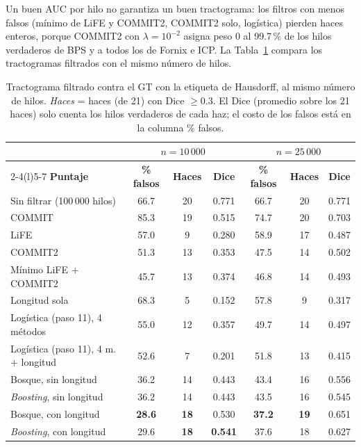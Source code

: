 \documentclass[11pt,a4paper]{article}
\begin{document}
Un buen AUC por hilo no garantiza un buen tractograma: los filtros con menos falsos
(m\'inimo de LiFE y COMMIT2, COMMIT2 solo, log\'istica) pierden haces enteros, porque
COMMIT2 con $\lambda=10^{-2}$ asigna peso 0 al 99.7\,\% de los hilos verdaderos de BPS y a
todos los de Fornix e ICP. La Tabla~\ref{tab:modelos-haces} compara los tractogramas
filtrados con el mismo n\'umero de hilos.

\begin{table}[H]
\centering
\small
\begin{tabularx}{\textwidth}{@{}Xcccccc@{}}
\toprule
 & \multicolumn{3}{c}{$n=10\,000$} & \multicolumn{3}{c}{$n=25\,000$}\\
\cmidrule(lr){2-4}\cmidrule(l){5-7}
\textbf{Puntaje} & \textbf{\% falsos} & \textbf{Haces} & \textbf{Dice} & \textbf{\% falsos} & \textbf{Haces} & \textbf{Dice}\\
\midrule
Sin filtrar (100\,000 hilos)       & 66.7 & 20 & 0.771 & 66.7 & 20 & 0.771\\
COMMIT                             & 85.3 & 19 & 0.515 & 74.7 & 20 & 0.703\\
LiFE                               & 57.0 &  9 & 0.280 & 58.9 & 17 & 0.487\\
COMMIT2                            & 51.3 & 13 & 0.353 & 47.5 & 14 & 0.502\\
M\'inimo LiFE + COMMIT2            & 45.7 & 13 & 0.374 & 46.8 & 14 & 0.493\\
Longitud sola                      & 68.3 &  5 & 0.152 & 57.8 &  9 & 0.317\\
\addlinespace
Log\'istica (paso 11), 4 m\'etodos & 55.0 & 12 & 0.357 & 49.7 & 14 & 0.497\\
Log\'istica (paso 11), 4 m. + longitud & 52.6 &  7 & 0.201 & 51.8 & 13 & 0.415\\
Bosque, sin longitud               & 36.2 & 14 & 0.443 & 43.4 & 16 & 0.556\\
\textit{Boosting}, sin longitud    & 36.2 & 14 & 0.443 & 43.5 & 16 & 0.545\\
Bosque, con longitud               & \textbf{28.6} & \textbf{18} & 0.530 & \textbf{37.2} & \textbf{19} & 0.651\\
\textit{Boosting}, con longitud    & 29.6 & \textbf{18} & \textbf{0.541} & 37.6 & 18 & 0.627\\
\bottomrule
\end{tabularx}
\caption{Tractograma filtrado contra el GT con la etiqueta de Hausdorff, al mismo n\'umero de
hilos. \emph{Haces} = haces (de 21) con Dice $\ge0.3$. El Dice (promedio sobre los 21 haces)
solo cuenta los hilos verdaderos de cada haz; el costo de los falsos est\'a en la columna
\% falsos.}
\label{tab:modelos-haces}
\end{table}
\end{document}
